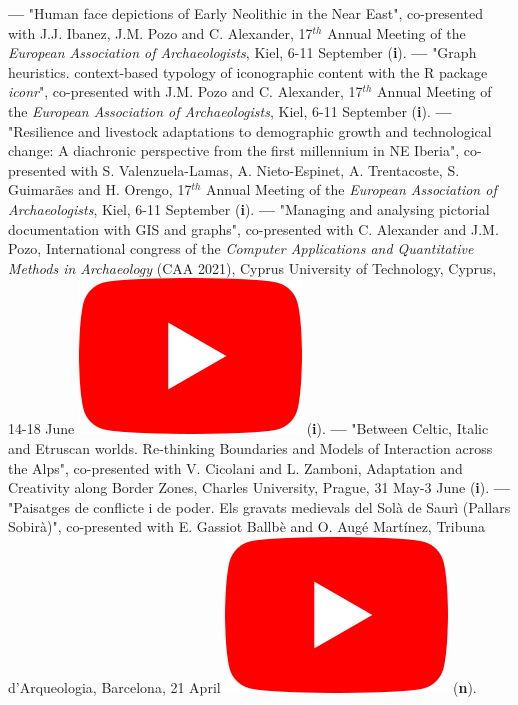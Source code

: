 \documentclass{article}
\begin{document}
\smallbreak
\textbf{--- }"Human face depictions of Early Neolithic in the Near East", co-presented with J.J. Ibanez, J.M. Pozo and C. Alexander, 17${}^{th}$ Annual Meeting of the \textit{European Association of Archaeologists}, Kiel, 6-11 September (\textbf{i}).
\smallbreak
\textbf{--- }"Graph heuristics. context-based typology of iconographic content with the R package \textit{iconr}", co-presented with J.M. Pozo and C. Alexander, 17${}^{th}$ Annual Meeting of the \textit{European Association of Archaeologists}, Kiel, 6-11 September (\textbf{i}).
\smallbreak
\textbf{--- }"Resilience and livestock adaptations to demographic growth and technological change: A diachronic perspective from the first millennium in NE Iberia", co-presented with S. Valenzuela-Lamas, A. Nieto-Espinet, A. Trentacoste, S. Guimarães and H. Orengo, 17${}^{th}$ Annual Meeting of the \textit{European Association of Archaeologists}, Kiel, 6-11 September (\textbf{i}).
\smallbreak
\textbf{--- }"Managing and analysing pictorial documentation with GIS and graphs", co-presented with C. Alexander and J.M. Pozo, International congress of the \textit{Computer Applications and Quantitative Methods in Archaeology} (CAA 2021), Cyprus University of Technology, Cyprus, 14-18 June \href{https://youtu.be/tUhHhzGSgbk?t=4950}{\includegraphics[scale=0.2]{icon_youtube}} (\textbf{i}).
\smallbreak
\textbf{--- }"Between Celtic, Italic and Etruscan worlds. Re-thinking Boundaries and Models of Interaction across the Alps", co-presented with V. Cicolani and L. Zamboni, Adaptation and Creativity along Border Zones, Charles University, Prague, 31 May-3 June (\textbf{i}).
\smallbreak
\textbf{--- }"Paisatges de conflicte i de poder. Els gravats medievals del Sol\`{a} de Saur\`{i} (Pallars Sobir\`{a})", co-presented with E. Gassiot Ballb\`{e} and O. Aug\'{e} Mart\'{i}nez, Tribuna d'Arqueologia, Barcelona, 21 April \href{https://www.youtube.com/watch?v=4b7gLw4NV_E}{\includegraphics[scale=0.2]{icon_youtube}} (\textbf{n}).
\end{document}
